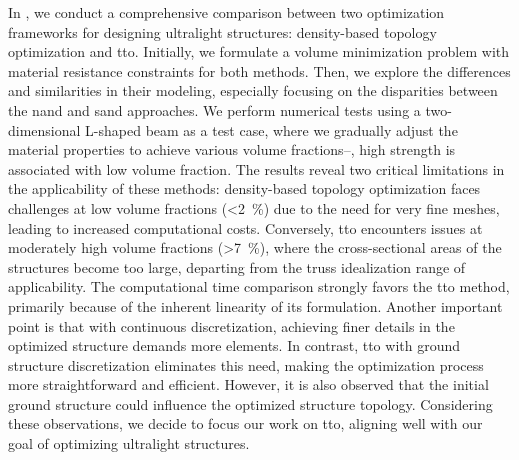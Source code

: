 In , we conduct a comprehensive comparison between two optimization frameworks for designing ultralight structures: density-based topology optimization and \gls{tto}. Initially, we formulate a volume minimization problem with material resistance constraints for both methods. Then, we explore the differences and similarities in their modeling, especially focusing on the disparities between the \gls{nand} and \gls{sand} approaches. We perform numerical tests using a two-dimensional L-shaped beam as a test case, where we gradually adjust the material properties to achieve various volume fractions--\ie, high strength is associated with low volume fraction. The results reveal two critical limitations in the applicability of these methods: density-based topology optimization faces challenges at low volume fractions (<\qty{2}{\percent}) due to the need for very fine meshes, leading to increased computational costs. Conversely, \gls{tto} encounters issues at moderately high volume fractions (>\qty{7}{\percent}), where the cross-sectional areas of the structures become too large, departing from the truss idealization range of applicability. The computational time comparison strongly favors the \gls{tto} method, primarily because of the inherent linearity of its formulation. Another important point is that with continuous discretization, achieving finer details in the optimized structure demands more elements. In contrast, \gls{tto} with ground structure discretization eliminates this need, making the optimization process more straightforward and efficient. However, it is also observed that the initial ground structure could influence the optimized structure topology. Considering these observations, we decide to focus our work on \gls{tto}, aligning well with our goal of optimizing ultralight structures.

